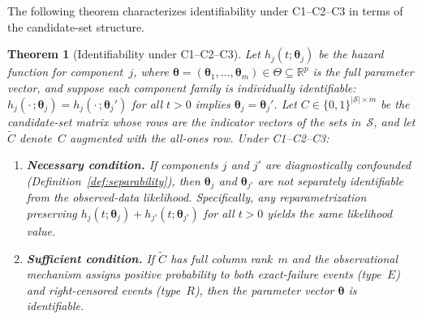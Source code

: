 \documentclass[11pt]{article}
\theoremstyle{definition}
\theoremstyle{plain}
\newtheorem{theorem}{Theorem}
\renewcommand{\v}[1]{\boldsymbol{#1}}
\begin{document}
The following theorem characterizes identifiability under C1--C2--C3
in terms of the candidate-set structure.

\begin{theorem}[Identifiability under C1--C2--C3]
\label{thm:identifiability}
Let $h_j(t; \v{\theta}_j)$ be the hazard function for component~$j$,
where $\v{\theta} = (\v{\theta}_1, \ldots, \v{\theta}_m) \in \Theta
\subseteq \mathbb{R}^p$ is the full parameter vector, and suppose
each component family is individually identifiable: $h_j(\cdot\,;
\v{\theta}_j) = h_j(\cdot\,; \v{\theta}_j')$ for all $t > 0$ implies
$\v{\theta}_j = \v{\theta}_j'$.
Let $C \in \{0,1\}^{|\mathcal{S}| \times m}$ be the candidate-set
matrix whose rows are the indicator vectors of the sets
in~$\mathcal{S}$, and let $\tilde{C}$ denote~$C$ augmented with the
all-ones row.
Under C1--C2--C3:
\begin{enumerate}
    \item[\emph{(a)}] \textbf{Necessary condition.}
    If components $j$ and $j'$ are diagnostically confounded
    (Definition~\ref{def:separability}), then $\v{\theta}_j$ and
    $\v{\theta}_{j'}$ are not separately identifiable from the
    observed-data likelihood.
    Specifically, any reparametrization preserving
    $h_j(t; \v{\theta}_j) + h_{j'}(t; \v{\theta}_{j'})$ for all
    $t > 0$ yields the same likelihood value.

    \item[\emph{(b)}] \textbf{Sufficient condition.}
    If $\tilde{C}$ has full column rank~$m$ and the observational
    mechanism assigns positive probability to both exact-failure
    events (type~$E$) and right-censored events (type~$R$),
    then the parameter vector $\v{\theta}$ is identifiable.
\end{enumerate}
\end{theorem}
\end{document}
